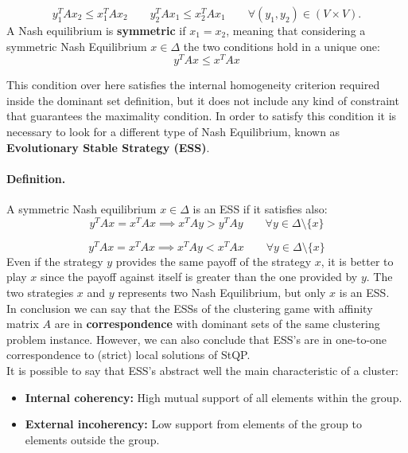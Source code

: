 $$y_1^TAx_2 \leq x_1^TAx_2 \qquad y_2^TAx_1 \leq x_2^TAx_1 \qquad \forall (y_1,y_2) \in (V\times V).$$ 
A Nash equilibrium is \textbf{symmetric} if $x_1 = x_2$, meaning that considering a symmetric Nash Equilibrium $x \in \Delta$ the two conditions hold in a unique one:
$$y^TAx \leq x^TAx$$

This condition over here satisfies the internal homogeneity criterion required inside the dominant set definition, but it does not include any kind of constraint that guarantees the maximality condition. In order to satisfy this condition it is necessary to look for a different type of Nash Equilibrium, known as \textbf{Evolutionary Stable Strategy (ESS)}. 

\paragraph{Definition.} A symmetric Nash equilibrium $x\in \Delta$ is an ESS if it satisfies also:
$$y^TAx = x^TAx \implies x^TAy > y^TAy \qquad \forall y \in \Delta\setminus\{x\}$$

$$y^TAx = x^TAx \implies x^TAy < x^TAx \qquad \forall y \in \Delta\setminus\{x\}$$
Even if the strategy $y$ provides the same payoff of the strategy $x$, it is better to play $x$ since the payoff against itself is greater than the one provided by $y$. The two strategies $x$ and $y$ represents two Nash Equilibrium, but only $x$ is an ESS.\\
In conclusion we can say that the ESSs of the clustering game with affinity matrix $A$ are in \textbf{correspondence} with dominant sets of the same clustering problem instance. However, we can also conclude that ESS’s are in one-to-one correspondence to (strict) local solutions of StQP.\\
It is possible to say that ESS's abstract well the main characteristic of a cluster:
\begin{itemize}
	\item \textbf{Internal coherency:} High mutual support of all elements within the group.
	\item \textbf{External incoherency:} Low support from elements of the group to elements outside the group.
\end{itemize}



